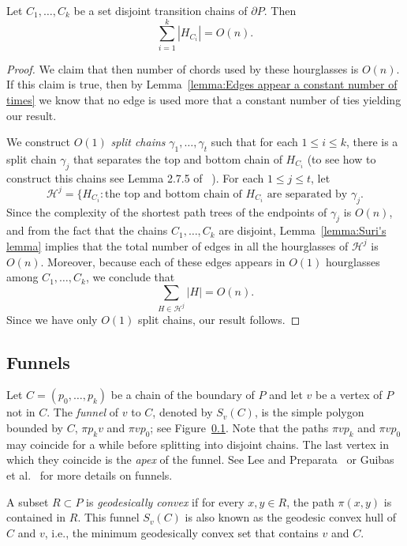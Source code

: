 \documentclass[a4paper,UKenglish]{lipics}
\newcommand{\fn}[2]{\ensuremath{S_{\scriptscriptstyle #1}(#2)}}
\newcommand{\p}[2]{\ensuremath{\pi(#1, #2)}}
\begin{document}
\begin{lemma}\label{lemma:Bounding complexity of transition hourglasses}
Let $C_1, \ldots, C_k$ be a set disjoint transition chains of $\partial P$. 
Then $$\sum_{i=1}^k |H_{C_i}| = O(n).$$
\end{lemma}
\begin{proof}
We claim that then number of chords used by these hourglasses is $O(n)$. If this claim is true, then by Lemma~\ref{lemma:Edges appear a constant number of times} we know that no edge is used more that a constant number of ties yielding our result.

We construct $O(1)$ \emph{split chains} $\gamma_1, \ldots, \gamma_t$ such that for each $1\leq i\leq k$, there is a split chain $\gamma_j$ that separates the top and bottom chain of $H_{C_i}$ (to see how to construct this chains see Lemma 2.7.5 of ~\cite{aronov1993furthest}).
For each $1\leq j\leq t$, let $$\mathcal H^j = \{H_{C_i} : \text{the top and bottom chain of $H_{C_i}$ are separated by }\gamma_j.$$
Since the complexity of the shortest path trees of the endpoints of $\gamma_j$ is $O(n)$,
and from the fact that the chains $C_1, \ldots, C_k$ are disjoint,  Lemma~\ref{lemma:Suri's lemma} implies that
the total number of edges in all the hourglasses of $\mathcal H^j$ is $O(n)$. Moreover, because each of these edges appears in $O(1)$ hourglasses among $C_1, \ldots, C_k$, we conclude that 
$$\sum_{H \in \mathcal H^j } |H| = O(n).$$
Since we have only $O(1)$ split chains, our result follows.
\end{proof}

\subsection{Funnels}

Let $C = (p_0, \ldots, p_k)$ be a chain of the boundary of $P$ and let $v$ be a vertex of $P$ not in $C$.
The \emph{funnel} of $v$ to $C$, denoted by $\fn{v}{C}$, is the simple polygon bounded by $C$, $\pi{p_k}{v}$ and $\pi{v}{p_0}$; see Figure~\ref{}. 
Note that the paths $\pi{v}{p_k}$ and $\pi{v}{p_0}$ may coincide for a while before splitting into disjoint chains. 
The last vertex in which they coincide is the \emph{apex} of the funnel. 
See Lee and Preparata~\cite{lee1984euclidean} or Guibas et al.~\cite{guibasShortestPathTree} for more details on funnels.

A subset $R\subset P$ is \emph{geodesically convex} if for every $x,y\in R$, the path $\p{x}{y}$ is contained in $R$.
This funnel $\fn{v}{C}$ is also known as the geodesic convex hull of $C$ and $v$, i.e., the minimum geodesically convex set that contains $v$ and $C$.
\end{document}
